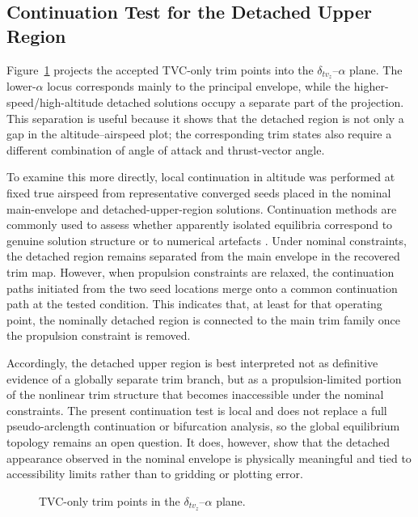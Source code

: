 \documentclass[conf]{new-aiaa}
\begin{document}
\subsection{Continuation Test for the Detached Upper Region}
Figure~\ref{fig:deltaz_alpha_branch_scatter} projects the accepted TVC-only trim points into the $\delta_{tv_z}$--$\alpha$ plane. The lower-$\alpha$ locus corresponds mainly to the principal envelope, while the higher-speed/high-altitude detached solutions occupy a separate part of the projection. This separation is useful because it shows that the detached region is not only a gap in the altitude--airspeed plot; the corresponding trim states also require a different combination of angle of attack and thrust-vector angle.

To examine this more directly, local continuation in altitude was performed at fixed true airspeed from representative converged seeds placed in the nominal main-envelope and detached-upper-region solutions. Continuation methods are commonly used to assess whether apparently isolated equilibria correspond to genuine solution structure or to numerical artefacts \cite{ParanjapeSinhaAnanthkrishnan2007,SharmaEtAl2015}. Under nominal constraints, the detached region remains separated from the main envelope in the recovered trim map. However, when propulsion constraints are relaxed, the continuation paths initiated from the two seed locations merge onto a common continuation path at the tested condition. This indicates that, at least for that operating point, the nominally detached region is connected to the main trim family once the propulsion constraint is removed.

Accordingly, the detached upper region is best interpreted not as definitive evidence of a globally separate trim branch, but as a propulsion-limited portion of the nonlinear trim structure that becomes inaccessible under the nominal constraints. The present continuation test is local and does not replace a full pseudo-arclength continuation or bifurcation analysis, so the global equilibrium topology remains an open question. It does, however, show that the detached appearance observed in the nominal envelope is physically meaningful and tied to accessibility limits rather than to gridding or plotting error.

\begin{figure}[!h]
\centering
{}\datatable
{}
\caption{TVC-only trim points in the $\delta_{tv_z}$--$\alpha$ plane.}
\label{fig:deltaz_alpha_branch_scatter}
\end{figure}
\end{document}
